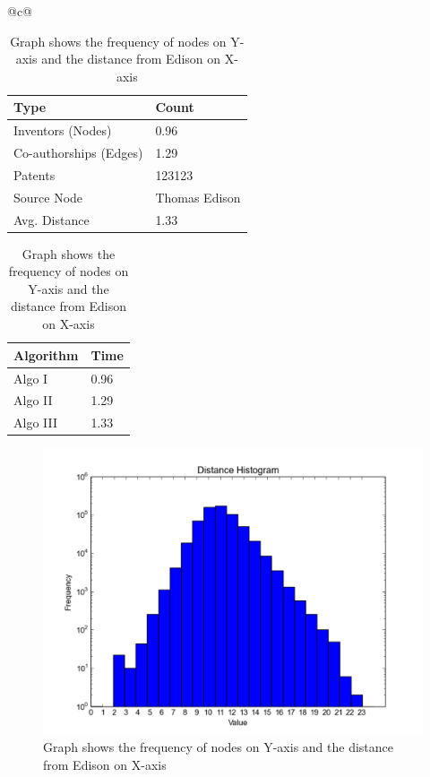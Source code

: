 \begin{table}[h] 
  \begin{tabular}{@{}c@{}} 
  \begin{minipage}{0.4\linewidth}
		\begin{center}
	  		\begin{tabular}{| l | l |}
				\hline
				{Type} & {Count} \\
				\hline
				\hline
				Inventors (Nodes) & 0.96 \\
				Co-authorships (Edges) & 1.29 \\
				Patents & 123123 \\
				Source Node & Thomas Edison\\
				Avg. Distance & 1.33 \\
				\hline
			\end{tabular}		
			\caption {Details of the co-authorship graph}
			\label{tab:model}

			\vspace{0.85cm}

			\begin{tabular}{| l | l |}
				\hline
				{Algorithm} & {Time} \\
				\hline
				\hline
				Algo I & 0.96 \\
				Algo II & 1.29 \\
				Algo III & 1.33 \\
				\hline
			\end{tabular}
			\caption {Performance of the three shortest path algorithms}
			\label{tab:algos}
		\end{center}

  \end{minipage}
  \hspace{0.05\linewidth}
  \begin{minipage}{0.45\linewidth}
      \begin{figure}[H]
          \includegraphics[scale=0.425]{../figures/distance.pdf}
          \caption{Graph shows the frequency of nodes on Y-axis and the distance from
		Edison on X-axis }
	  \label{fig:distance}
      \end{figure}
  \end{minipage}
  \end{tabular}
\end{table}

